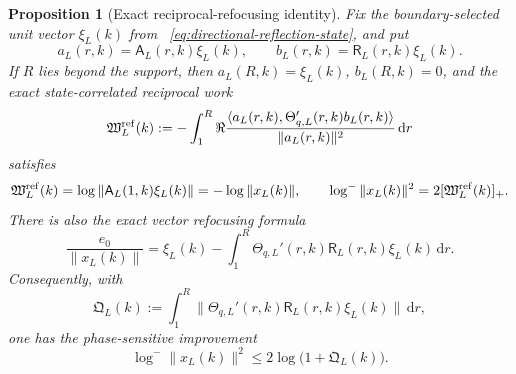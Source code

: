 \documentclass[11pt]{article}
\newcommand{\dd}{\,\mathrm d}
\newtheorem{proposition}[theorem]{Proposition}
\theoremstyle{definition}
\theoremstyle{remark}
\begin{document}
\begin{proposition}[Exact reciprocal-refocusing identity]
Fix the boundary-selected unit vector $\xi_L(k)$ from
~\eqref{eq:directional-reflection-state}, and put
\begin{equation}
 a_L(r,k)=\mathsf A_L(r,k)\xi_L(k),
 \qquad
 b_L(r,k)=\mathsf R_L(r,k)\xi_L(k).
 \label{eq:refocusing-selected-state}
\end{equation}
If $R$ lies beyond the support, then $a_L(R,k)=\xi_L(k)$,
$b_L(R,k)=0$, and the exact state-correlated reciprocal work
\begin{equation}
 \mathfrak W^{\rm ref}_L(k)
 :=-\int_1^R
  \Re\frac{\langle a_L(r,k),
             \Theta_{q,L}'(r,k)b_L(r,k)\rangle}
            {\|a_L(r,k)\|^2}\dd r
 \label{eq:exact-refocusing-work}
\end{equation}
satisfies
\begin{equation}
 \mathfrak W^{\rm ref}_L(k)
 =\log\|\mathsf A_L(1,k)\xi_L(k)\|
 =-\log\|x_L(k)\|,
 \qquad
 \log^-\|x_L(k)\|^2=2[\mathfrak W^{\rm ref}_L(k)]_+.
 \label{eq:exact-refocusing-entropy}
\end{equation}
There is also the exact vector refocusing formula
\begin{equation}
 \frac{e_0}{\|x_L(k)\|}
 =\xi_L(k)-\int_1^R
   \Theta_{q,L}'(r,k)\mathsf R_L(r,k)\xi_L(k)\dd r.
 \label{eq:exact-vector-refocusing}
\end{equation}
Consequently, with
\begin{equation}
 \mathfrak Q_L(k):=\int_1^R
  \|\Theta_{q,L}'(r,k)\mathsf R_L(r,k)\xi_L(k)\|\dd r,
 \label{eq:reciprocal-reflection-action}
\end{equation}
one has the phase-sensitive improvement
\begin{equation}
 \log^-\|x_L(k)\|^2
 \leq2\log\bigl(1+\mathfrak Q_L(k)\bigr).
 \label{eq:reciprocal-reflection-entropy-bound}
\end{equation}
\end{proposition}
\end{document}
